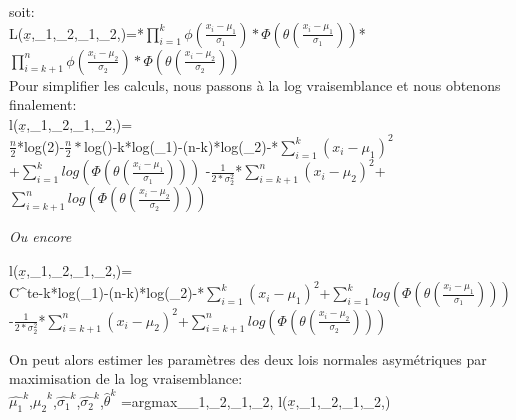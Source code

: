 {soit: \\

L($\underline{x}$,\mu_1,\mu_2,\sigma_1,\sigma_2,\theta)=*$\displaystyle{\prod_{i=1}^k \phi(\frac{x_i-\mu_1}{\sigma_1})*\Phi(\theta(\frac{x_i-\mu_1}{\sigma_1})) }$*$\displaystyle{\prod_{i=k+1}^n \phi(\frac{x_i-\mu_2}{\sigma_2})*\Phi(\theta(\frac{x_i-\mu_2}{\sigma_2})) }$\\

Pour simplifier les calculs, nous passons à la log vraisemblance et nous obtenons finalement:\\


{\center 
l($\underline{x}$,\mu_1,\mu_2,\sigma_1,\sigma_2,\theta)=\\
$\frac{n}{2}$*log(2)-$\frac{n}{2}*$log(\pi)-k*log(\sigma_1)-(n-k)*log(\sigma_2)-*$\displaystyle{\sum_{i=1}^k (x_i-\mu_1)^2}$\\
+$\displaystyle{\sum_{i=1}^k log(\Phi(\theta(\frac{x_i-\mu_1}{\sigma_1})))}$
-$\frac{1}{2*\sigma_2^2}$*$\displaystyle{\sum_{i=k+1}^n (x_i-\mu_2)^2}$+$\displaystyle{\sum_{i=k+1}^n log(\Phi(\theta(\frac{x_i-\mu_2}{\sigma_2})))}$
}

\vspace{1cm}

\textit{Ou encore}

{\center 
l($\underline{x}$,\mu_1,\mu_2,\sigma_1,\sigma_2,\theta)=\\
C^{te}-k*log(\sigma_1)-(n-k)*log(\sigma_2)-*$\displaystyle{\sum_{i=1}^k (x_i-\mu_1)^2}$+$\displaystyle{\sum_{i=1}^k log(\Phi(\theta(\frac{x_i-\mu_1}{\sigma_1})))}$\\
-$\frac{1}{2*\sigma_2^2}$*$\displaystyle{\sum_{i=k+1}^n (x_i-\mu_2)^2}$+$\displaystyle{\sum_{i=k+1}^n log(\Phi(\theta(\frac{x_i-\mu_2}{\sigma_2})))}$
}

\vspace{1cm}

On peut alors estimer les paramètres des deux lois normales asymétriques par maximisation de la log vraisemblance:\\

 $\hat{\mu_1}^k$,$\hat{\mu_2}^k$,$\hat{\sigma_1}^k$,$\hat{\sigma_2}^k$,$\hat{\theta}^k$ \hspace{0.05cm}=\hspace{0.05cm}argmax_{\mu_1,\mu_2,\sigma_1,\sigma_2,\theta} \hspace{0.1cm}l($\underline{x}$,\mu_1,\mu_2,\sigma_1,\sigma_2,\theta)\\
 
}

